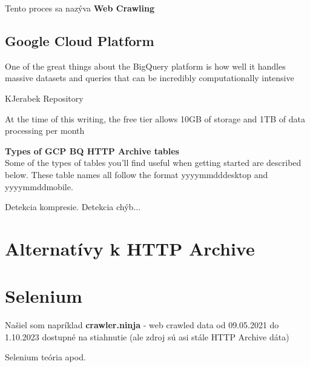 Tento proces sa nazýva \textbf{Web Crawling}

\subsection{Google Cloud Platform}

One of the great things about the BigQuery platform is how well it handles massive datasets and queries that can be incredibly computationally intensive

KJerabek Repository

At the time of this writing, the free tier allows 10GB of storage and 1TB of data processing per month

\textbf{Types of GCP BQ HTTP Archive tables}
\\
Some of the types of tables you'll find useful when getting started are described below. These table names all follow the format yyyy\textunderscore mm\textunderscore dd\textunderscore desktop and yyyy\textunderscore mm\textunderscore dd\textunderscore mobile.

Detekcia kompresie. Detekcia chýb...

\section{Alternatívy k HTTP Archive}

\section{Selenium}

Našiel som napríklad \textbf{crawler.ninja} - web crawled data od 09.05.2021 do 1.10.2023 dostupné na stiahnutie (ale zdroj sú asi stále HTTP Archive dáta)


Selenium teória apod.
